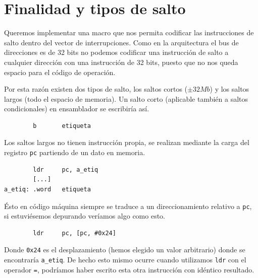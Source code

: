 
\pagestyle{fancy}
\fancyhead[LE,RO]{\thepage}
\fancyhead[LO]{\nouppercase{\rightmark}}

\label{chp:MacroADDEXC}
\minitoc

\section{Finalidad y tipos de salto}

Queremos implementar una macro que nos permita codificar las
instrucciones de salto dentro del vector de interrupciones. Como en
la arquitectura el bus de direcciones es de 32 bits no podemos
codificar una instrucción de salto a cualquier dirección con
una instrucción de 32 bits, puesto que no nos queda espacio
para el código de operación.

Por esta razón existen dos tipos de salto, los saltos cortos
($\pm 32Mb$) y los saltos largos (todo el espacio de memoria). Un
salto corto (aplicable también a saltos condicionales) en
ensamblador se escribiría así.

\begin{lstlisting}
        b       etiqueta
\end{lstlisting}

Los saltos largos no tienen instrucción propia, se realizan mediante
la carga del registro {\tt pc} partiendo de un dato en memoria.

\begin{lstlisting}
        ldr     pc, a_etiq
        [...]
a_etiq: .word   etiqueta
\end{lstlisting}

Ésto en código máquina siempre se traduce a un direccionamiento
relativo a {\tt pc}, si estuviésemos depurando veríamos algo como
esto.

\begin{lstlisting}
        ldr     pc, [pc, #0x24]
\end{lstlisting}

Donde {\tt 0x24} es el desplazamiento (hemos elegido un valor arbitrario)
donde se encontraría {\tt a\_etiq}. De hecho esto mismo ocurre cuando utilizamos
{\tt ldr} con el operador {\tt =}, podríamos haber escrito esta otra instrucción
con idéntico resultado.

